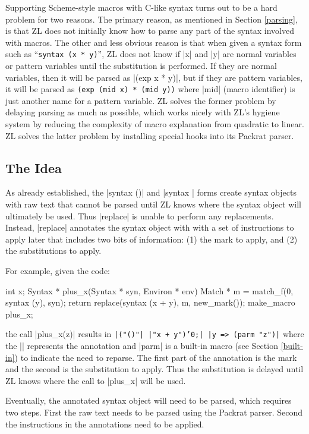 Supporting Scheme-style macros with C-like syntax turns out to be a
hard problem for two reasons.  The primary reason, as mentioned in
Section \ref{parsing}, is that ZL does not initially know how to
parse any part of the syntax involved with macros.  The other and less
obvious reason is that when given a syntax form such as
``\verb|syntax (x * y)|'', ZL does not know if |x| and |y| are normal
variables or pattern variables until the substitution is performed.
If they are normal variables, then it will be parsed as |(exp x * y)|,
but if they are pattern variables, it will be parsed as {\tt {(exp
    (mid~x) * (mid~y))}} where |mid| (macro identifier) is just
another name for a pattern variable.  ZL solves the former problem by
delaying parsing as much as possible, which works nicely with ZL's
hygiene system by reducing the complexity of macro explanation from
quadratic to linear.  ZL solves the latter problem by installing
special hooks into its Packrat parser.

\subsection{The Idea}
\label{reparser-idea}

As already established, the |syntax ()| and |syntax {}| forms create
syntax objects with raw text that cannot be parsed until ZL knows
where the syntax object will ultimately be used.  Thus |replace| is unable to
perform any replacements.  Instead, |replace| annotates the
syntax object with with a set of instructions to apply later that
includes two bits of information: (1) the mark to apply, and (2) the
substitutions to apply.

For example, given the code:
\begin{code}
int x;
Syntax * plus_x(Syntax * syn, Environ * env) {
  Match * m = match_f(0, syntax (y), syn);
  return replace(syntax (x + y), m, new_mark());
}
make_macro plus_x;
\end{code}
the call |plus_x(z)| results in 
{\tt |("()"| |"x + y"){'0;| |y => (parm "z")}|} 
where the |{}| represents the annotation and |parm| is
a built-in macro (see Section \ref{built-in}) to indicate the need to reparse.
The first part of the annotation is the mark and the second is the
substitution to apply.  Thus the substitution is delayed until ZL
knows where the call to |plus_x| will be used.

Eventually, the annotated syntax object will need to be parsed, which
requires two steps. First the raw text needs to be parsed using the
Packrat parser. Second the instructions in the annotations need to be
applied.

